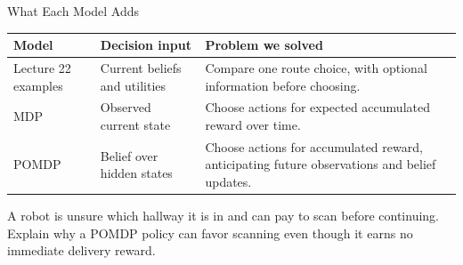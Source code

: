 \documentclass[aspectratio=169,10pt]{beamer}
\begin{document}
\begin{frame}{What Each Model Adds}
  \small
  \begin{center}
    \renewcommand{\arraystretch}{1.6}
    \begin{tabular}{l|p{}|p{}}
      \textbf{Model} & \textbf{Decision input} & \textbf{Problem we solved} \\\hline
      Lecture 22 examples & Current beliefs and utilities & Compare one route choice, with optional information before choosing. \\
      MDP & Observed current state & Choose actions for expected accumulated reward over time. \\
      POMDP & Belief over hidden states & Choose actions for accumulated reward, anticipating future observations and belief updates.
    \end{tabular}
  \end{center}
  \begin{activity}
    A robot is unsure which hallway it is in and can pay to scan before continuing. Explain why a POMDP policy can favor scanning even though it earns no immediate delivery reward.
  \end{activity}
\end{frame}
\end{document}
